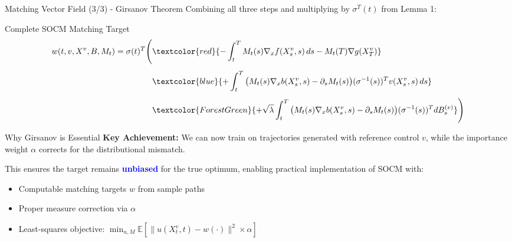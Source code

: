 \documentclass[aspectratio=169,xcolor=dvipsnames]{beamer}
\begin{document}
\begin{frame}[allowframebreaks]{Matching Vector Field (3/3) - Girsanov Theorem}
    Combining all three steps and multiplying by $\sigma^T(t)$ from Lemma 1:
    
    \begin{alertblock}{Complete SOCM Matching Target}
        \begin{equation}
        \begin{aligned}
        w(t, v, X^v, B, M_t) = \sigma(t)^T \Bigg(
        &\textcolor{red}{- \int_t^T M_t(s) \nabla_x f(X_s^v, s)\, ds - M_t(T)\nabla g(X_T^v)} \\[4pt]
        &\textcolor{blue}{+ \int_t^T \big(M_t(s)\nabla_x b(X_s^v, s) - \partial_s M_t(s)\big)(\sigma^{-1}(s))^T v(X_s^v, s)\, ds} \\[4pt]
        &\textcolor{ForestGreen}{+ \sqrt{\lambda} \int_t^T \big(M_t(s)\nabla_x b(X_s^v, s) - \partial_s M_t(s)\big)(\sigma^{-1}(s))^T dB_s^{(v)}}
        \Bigg)
        \end{aligned}
        \end{equation}
    \end{alertblock}
    
    \vspace{0.8cm}
    
    \begin{block}{Why Girsanov is Essential}
        \textbf{Key Achievement:} We can now train on trajectories generated with reference control $v$, while the importance weight $\alpha$ corrects for the distributional mismatch.
        
        \vspace{0.3cm}
        
        This ensures the target remains \textcolor{blue}{\textbf{unbiased}} for the true optimum, enabling practical implementation of SOCM with:
        \begin{itemize}
            \item Computable matching targets $w$ from sample paths
            \item Proper measure correction via $\alpha$
            \item Least-squares objective: $\min_{u,M} \mathbb{E}[\|u(X^v_t,t) - w(\cdot)\|^2 \times \alpha]$
        \end{itemize}
    \end{block}
    
    \framebreak
\end{frame}
\end{document}

